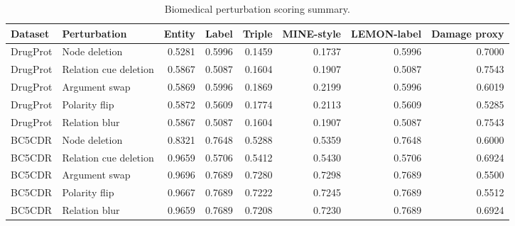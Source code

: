 \begin{table}[t]
\centering
\caption{Biomedical perturbation scoring summary.}
\label{tab:biomedical-final}
\scriptsize
\begin{tabular}{llrrrrrr}
\toprule
Dataset & Perturbation & Entity & Label & Triple & MINE-style & LEMON-label & Damage proxy \\
\midrule
DrugProt & Node deletion & 0.5281 & 0.5996 & 0.1459 & 0.1737 & 0.5996 & 0.7000 \\
DrugProt & Relation cue deletion & 0.5867 & 0.5087 & 0.1604 & 0.1907 & 0.5087 & 0.7543 \\
DrugProt & Argument swap & 0.5869 & 0.5996 & 0.1869 & 0.2199 & 0.5996 & 0.6019 \\
DrugProt & Polarity flip & 0.5872 & 0.5609 & 0.1774 & 0.2113 & 0.5609 & 0.5285 \\
DrugProt & Relation blur & 0.5867 & 0.5087 & 0.1604 & 0.1907 & 0.5087 & 0.7543 \\
BC5CDR & Node deletion & 0.8321 & 0.7648 & 0.5288 & 0.5359 & 0.7648 & 0.6000 \\
BC5CDR & Relation cue deletion & 0.9659 & 0.5706 & 0.5412 & 0.5430 & 0.5706 & 0.6924 \\
BC5CDR & Argument swap & 0.9696 & 0.7689 & 0.7280 & 0.7298 & 0.7689 & 0.5500 \\
BC5CDR & Polarity flip & 0.9667 & 0.7689 & 0.7222 & 0.7245 & 0.7689 & 0.5512 \\
BC5CDR & Relation blur & 0.9659 & 0.7689 & 0.7208 & 0.7230 & 0.7689 & 0.6924 \\
\bottomrule
\end{tabular}
\end{table}
